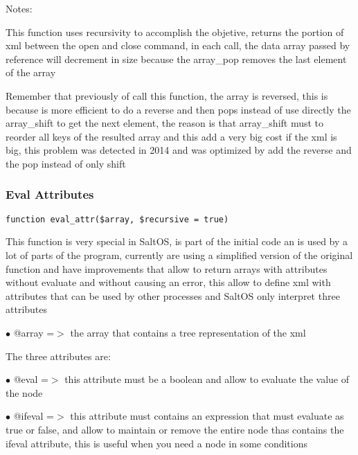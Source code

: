 \documentclass[a4paper]{article}
\begin{document}
Notes:

This function uses recursivity to accomplish the objetive, returns the portion
of xml between the open and close command, in each call, the data array passed
by reference will decrement in size because the array\_pop removes the last element
of the array

Remember that previously of call this function, the array is reversed, this is
because is more efficient to do a reverse and then pops instead of use directly
the array\_shift to get the next element, the reason is that array\_shift must to
reorder all keys of the resulted array and this add a very big cost if the xml
is big, this problem was detected in 2014 and was optimized by add the reverse
and the pop instead of only shift

\hypertarget{toc283}{}
\subsubsection{Eval Attributes}

\begin{lstlisting}
function eval_attr($array, $recursive = true)
\end{lstlisting}

This function is very special in SaltOS, is part of the initial code an
is used by a lot of parts of the program, currently are using a simplified
version of the original function and have improvements that allow to return
arrays with attributes without evaluate and without causing an error, this
allow to define xml with attributes that can be used by other processes and
SaltOS only interpret three attributes

\begin{compactitem}
\item[\color{myblue}$\bullet$] @array =$>$ the array that contains a tree representation of the xml
\end{compactitem}

The three attributes are:

\begin{compactitem}
\item[\color{myblue}$\bullet$] @eval =$>$ this attribute must be a boolean and allow to evaluate the value
of the node
\end{compactitem}

\begin{compactitem}
\item[\color{myblue}$\bullet$] @ifeval =$>$ this attribute must contains an expression that must evaluate as
true or false, and allow to maintain or remove the entire node thas contains
the ifeval attribute, this is useful when you need a node in some conditions
\end{compactitem}
\end{document}
